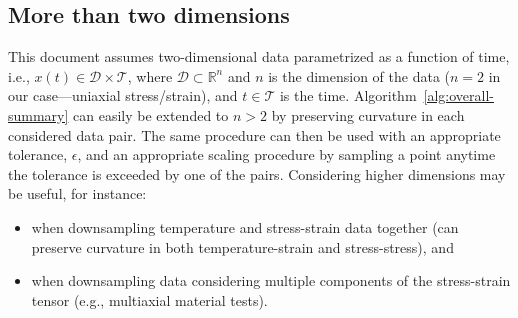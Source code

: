\documentclass[a4paper,11pt]{article}
\begin{document}
\subsection{More than two dimensions}

This document assumes two-dimensional data parametrized as a function of time, i.e., $x(t) \in \mathcal{D} \times \mathcal{T}$, where $\mathcal{D} \subset \mathbb{R}^n$ and $n$ is the dimension of the data ($n = 2$ in our case---uniaxial stress/strain), and $t \in \mathcal{T}$ is the time.
Algorithm~\ref{alg:overall-summary} can easily be extended to $n > 2$ by preserving curvature in each considered data pair.
The same procedure can then be used with an appropriate tolerance, $\epsilon$, and an appropriate scaling procedure by sampling a point anytime the tolerance is exceeded by one of the pairs.
Considering higher dimensions may be useful, for instance:
\begin{itemize}
    \item when downsampling temperature and stress-strain data together (can preserve curvature in both temperature-strain and stress-stress), and
    \item when downsampling data considering multiple components of the stress-strain tensor (e.g., multiaxial material tests).
\end{itemize}
\end{document}
